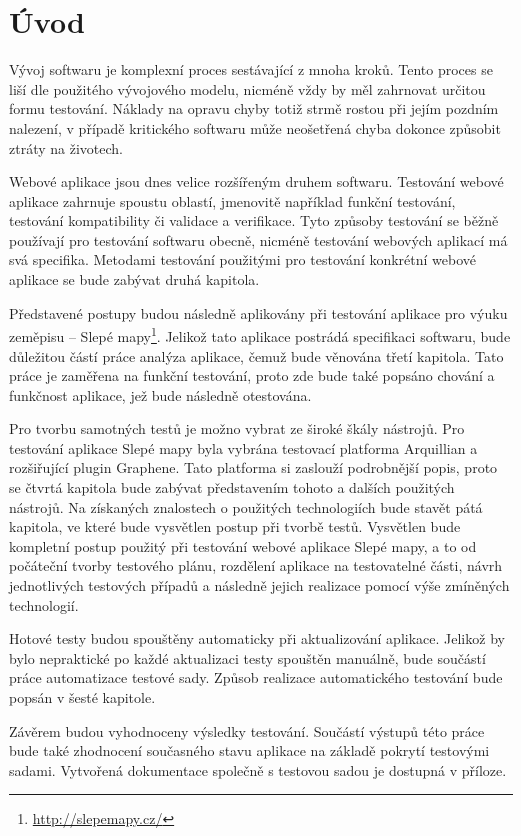 \documentclass[
    color,   %
	table,   %
    twoside, %
]{fithesis3}
\begin{document}
  \chapter{Úvod}
Vývoj softwaru je komplexní proces sestávající z mnoha kroků. Tento proces se liší dle použitého vývojového modelu, nicméně vždy by měl zahrnovat určitou formu testování. Náklady na opravu chyby totiž strmě rostou při jejím pozdním nalezení, v případě kritického softwaru může neošetřená chyba dokonce způsobit ztráty na životech.

Webové aplikace jsou dnes velice rozšířeným druhem softwaru. Testování webové aplikace zahrnuje spoustu oblastí, jmenovitě například funkční testování, testování kompatibility či validace a verifikace. Tyto způsoby testování se běžně používají pro testování softwaru obecně, nicméně testování webových aplikací má svá specifika. Metodami testování použitými pro testování konkrétní webové aplikace se bude zabývat druhá kapitola.

Představené postupy budou následně aplikovány při testování aplikace pro výuku zeměpisu – Slepé mapy\footnote{\url{http://slepemapy.cz/}}. Jelikož tato aplikace postrádá specifikaci softwaru, bude důležitou částí práce analýza aplikace, čemuž bude věnována třetí kapitola. Tato práce je zaměřena na funkční testování, proto zde bude také popsáno chování a funkčnost aplikace, jež bude následně otestována.

Pro tvorbu samotných testů je možno vybrat ze široké škály nástrojů. Pro testování aplikace Slepé mapy byla vybrána testovací platforma Arquillian a rozšiřující plugin Graphene. Tato platforma si zaslouží podrobnější popis, proto se čtvrtá kapitola bude zabývat představením tohoto a dalších použitých nástrojů.
Na získaných znalostech o použitých technologiích bude stavět pátá kapitola, ve které bude vysvětlen postup při tvorbě testů. Vysvětlen bude kompletní postup použitý při testování webové aplikace Slepé mapy, a to od počáteční tvorby testového plánu, rozdělení aplikace na testovatelné části, návrh jednotlivých testových případů a následně jejich realizace pomocí výše zmíněných technologií.

Hotové testy budou spouštěny automaticky při aktualizování aplikace. Jelikož by bylo  nepraktické po každé aktualizaci testy spouštěn manuálně, bude součástí práce automatizace testové sady. Způsob realizace automatického testování bude popsán v šesté kapitole.

Závěrem budou vyhodnoceny výsledky testování. Součástí výstupů této práce bude také zhodnocení současného stavu aplikace na základě pokrytí testovými sadami. Vytvořená dokumentace společně s testovou sadou je dostupná v příloze. 
\end{document}
